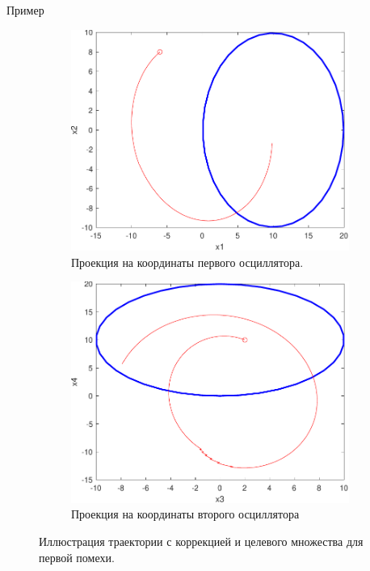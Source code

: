 \begin{section}{Пример}
\begin{figure}[ht]
    \centering
    \begin{subfigure}[b]{0.45\textwidth}
        \centering
        \includegraphics[width=\textwidth]{./resources/synthesis_1_first.pdf}
        \caption{Проекция на координаты первого осциллятора.}
        \label{subfig:synthesis_1_first}
    \end{subfigure}
    \hfill
    \begin{subfigure}[b]{0.45\textwidth}
        \centering
        \includegraphics[width=\textwidth]{./resources/synthesis_1_second.pdf}
        \caption{Проекция на координаты второго осциллятора}
        \label{subfig:synthesis_1_second}
    \end{subfigure}
    \caption{Иллюстрация траектории с коррекцией и целевого множества для первой помехи.}
    \label{fig:synthesis_1}
\end{figure}
\end{section}

